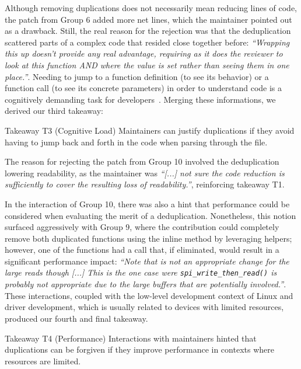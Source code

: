 \documentclass[10pt,conference]{IEEEtran}
\newenvironment{highlight-box}[1]{%
  \begin{tcolorbox}[colback=gray!10, colframe=gray!50!black, boxrule=0.5pt,
                    left=1mm, right=1mm, top=1mm, bottom=1mm, sharp corners]
  \textbf{#1:} \itshape}{\end{tcolorbox}}
\begin{document}
Although removing duplications does not necessarily mean reducing lines of code, the patch from Group 6 added more net lines, which the maintainer pointed out as a drawback. Still, the real reason for the rejection was that the deduplication scattered parts of a complex code that resided close together before: \textit{``Wrapping this up doesn't provide any real advantage, requiring as it does the reviewer to look at this function AND where the value is set rather than seeing them in one place.''}. Needing to jump to a function definition (to see its behavior) or a function call (to see its concrete parameters) in order to understand code is a cognitively demanding task for developers~\cite{questions-programmers-ask}. Merging these informations, we derived our third takeaway:

\begin{highlight-box}{Takeaway T3 (Cognitive Load)}
Maintainers can justify duplications if they avoid having to jump back and forth in the code when parsing through the file.
\end{highlight-box}

The reason for rejecting the patch from Group 10 involved the deduplication lowering readability, as the maintainer was \textit{``[...] not sure the code reduction is sufficiently to cover the resulting loss of readability.''}, reinforcing takeaway T1.

In the interaction of Group 10, there was also a hint that performance could be considered when evaluating the merit of a deduplication. Nonetheless, this notion surfaced aggressively with Group 9, where the contribution could completely remove both duplicated functions using the inline method by leveraging helpers; however, one of the functions had a call that, if eliminated, would result in a significant performance impact: \textit{``Note that is not an appropriate change for the large reads though [...] This is the one case were \texttt{spi\_write\_then\_read()} is probably not appropriate due to the large buffers that are potentially involved.''}. These interactions, coupled with the low-level development context of Linux and driver development, which is usually related to devices with limited resources, produced our fourth and final takeaway.

\begin{highlight-box}{Takeaway T4 (Performance)}
Interactions with maintainers hinted that duplications can be forgiven if they improve performance in contexts where resources are limited.
\end{highlight-box}
\end{document}
